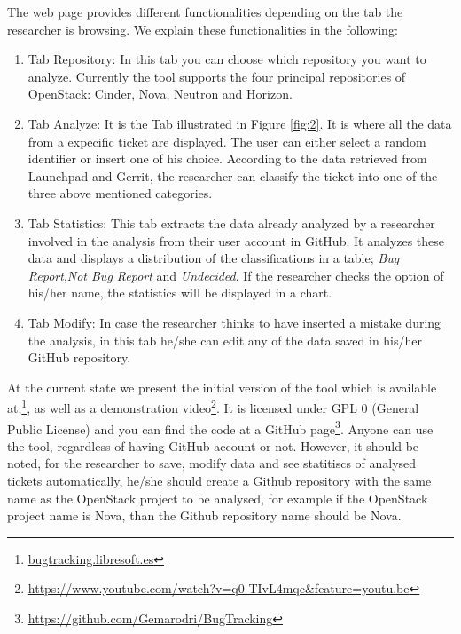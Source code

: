 \documentclass[runningheads,a4paper]{llncs}
\begin{document}
The web page provides different functionalities depending on the tab the researcher is browsing. We explain these functionalities in the following:
\begin{enumerate}
  \item Tab Repository: In this tab you can choose which repository you want to analyze. Currently the tool supports the four principal repositories of OpenStack: Cinder, Nova, Neutron and Horizon.
  \item Tab Analyze: It is the Tab illustrated in Figure \ref{fig:2}. It is where all the data from a expecific ticket are displayed. The user can either select a random identifier or insert one of his choice. According to the data retrieved from Launchpad and Gerrit, the researcher can classify the ticket into one of the three above mentioned categories.
  \item Tab Statistics: This tab extracts the data already analyzed by a researcher involved in the analysis from their user account in GitHub. It analyzes these data and displays a distribution of the classifications in a table; \textit{Bug Report},\textit{Not Bug Report} and \textit{Undecided}. If the researcher checks the option of his/her name, the statistics will be displayed in a chart.
  \item Tab Modify: In case the researcher thinks to have inserted a mistake during the analysis, in this tab he/she can edit any of the data saved in his/her GitHub repository. 
\end{enumerate}

At the current state we present the initial version of the tool which is available at;\footnote{\url{bugtracking.libresoft.es}}, as well as a demonstration video\footnote{\url{https://www.youtube.com/watch?v=q0-TIvL4mqc&feature=youtu.be}}. It is licensed under GPL 0 (General Public License) and you can find the code at a GitHub page\footnote{\url{https://github.com/Gemarodri/BugTracking}}. Anyone can use the tool, regardless of having GitHub account or not. However, it should be noted, for the researcher to save, modify data and see statitiscs of analysed tickets automatically, he/she should create a Github repository with the same name as the OpenStack project to be analysed, for example if the OpenStack project name is Nova, than the Github repository name should be Nova. 
\end{document}
